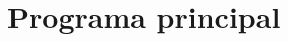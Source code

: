 \documentclass[assd_tp2_main.tex]{subfiles}
\begin{document}
\section{Programa principal}
\end{document}
